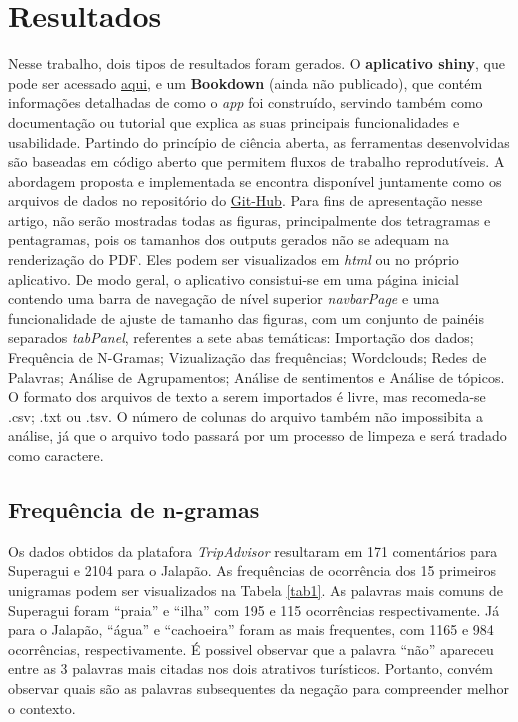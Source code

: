 \documentclass[preprint, 3p,
authoryear]{elsarticle} %
\begin{document}
\hypertarget{resultados}{%
\section{Resultados}\label{resultados}}

Nesse trabalho, dois tipos de resultados foram gerados. O
\textbf{aplicativo shiny}, que pode ser acessado
\href{https://8h163l-daphne-spier.shinyapps.io/shiny_text_analysis/}{aqui},
e um \textbf{Bookdown} (ainda não publicado), que contém informações
detalhadas de como o \emph{app} foi construído, servindo também como
documentação ou tutorial que explica as suas principais funcionalidades
e usabilidade. Partindo do princípio de ciência aberta, as ferramentas
desenvolvidas são baseadas em código aberto que permitem fluxos de
trabalho reprodutíveis. A abordagem proposta e implementada se encontra
disponível juntamente como os arquivos de dados no repositório do
\href{https://github.com/daphnespier/shiny_app}{Git-Hub}. Para fins de
apresentação nesse artigo, não serão mostradas todas as figuras,
principalmente dos tetragramas e pentagramas, pois os tamanhos dos
outputs gerados não se adequam na renderização do PDF. Eles podem ser
visualizados em \emph{html} ou no próprio aplicativo. De modo geral, o
aplicativo consistui-se em uma página inicial contendo uma barra de
navegação de nível superior \emph{navbarPage} e uma funcionalidade de
ajuste de tamanho das figuras, com um conjunto de painéis separados
\emph{tabPanel}, referentes a sete abas temáticas: Importação dos dados;
Frequência de N-Gramas; Vizualização das frequências; Wordclouds; Redes
de Palavras; Análise de Agrupamentos; Análise de sentimentos e Análise
de tópicos. O formato dos arquivos de texto a serem importados é livre,
mas recomeda-se .csv; .txt ou .tsv. O número de colunas do arquivo
também não impossibita a análise, já que o arquivo todo passará por um
processo de limpeza e será tradado como caractere.

\hypertarget{frequuxeancia-de-n-gramas}{%
\subsection{Frequência de n-gramas}\label{frequuxeancia-de-n-gramas}}

Os dados obtidos da platafora \emph{TripAdvisor} resultaram em 171
comentários para Superagui e 2104 para o Jalapão. As frequências de
ocorrência dos 15 primeiros unigramas podem ser visualizados na Tabela
\ref{tab1}. As palavras mais comuns de Superagui foram ``praia'' e
``ilha'' com 195 e 115 ocorrências respectivamente. Já para o Jalapão,
``água'' e ``cachoeira'' foram as mais frequentes, com 1165 e 984
ocorrências, respectivamente. É possivel observar que a palavra ``não''
apareceu entre as 3 palavras mais citadas nos dois atrativos turísticos.
Portanto, convém observar quais são as palavras subsequentes da negação
para compreender melhor o contexto.
\end{document}
